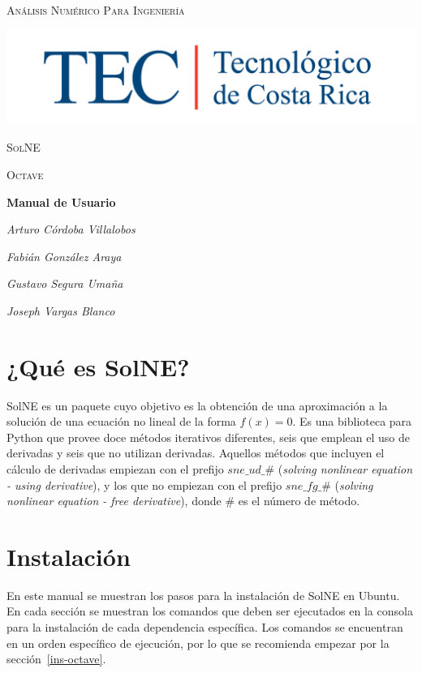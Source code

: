 \documentclass[12pt]{article}
\begin{document}
\begin{titlepage}
	\centering
	{\scshape\LARGE Análisis Numérico Para Ingeniería \par}
	\vspace{2cm}
	\includegraphics[width=16cm]{MarcaTECRGB}\par\vspace{2cm}
	{\scshape\Large SolNE\par}
	\vspace{0.5cm}
	{\scshape\LARGE Octave \par}
	\vspace{3cm}
	{\huge\bfseries Manual de Usuario\par}
	\vspace{3cm}
	{\Large\itshape Arturo Córdoba Villalobos\par}
	{\Large\itshape Fabián González Araya\par}
	{\Large\itshape Gustavo Segura Umaña\par}
	{\Large\itshape Joseph Vargas Blanco\par}

\end{titlepage}

\tableofcontents
\newpage	

\section{¿Qué es SolNE?}
SolNE es un paquete cuyo objetivo es la obtención de una aproximación a la solución de una ecuación no lineal de la forma $f(x) = 0$. Es una biblioteca para Python que provee doce métodos iterativos diferentes, seis que emplean el uso de derivadas y seis que no utilizan derivadas. Aquellos métodos que incluyen el cálculo de derivadas empiezan con el prefijo $sne\_ud\_\#$ (\textit{solving nonlinear equation - using derivative}), y los que no empiezan con el prefijo $sne\_fg\_\#$ (\textit{solving nonlinear equation - free derivative}), donde $\#$ es el número de método.

\section{Instalación}
En este  manual se muestran los pasos para la instalación de SolNE en Ubuntu. En cada sección se muestran los comandos que deben ser ejecutados en la consola para la instalación de cada dependencia específica. Los comandos se encuentran en un orden específico de ejecución, por lo que se recomienda empezar por la sección~\ref{ins-octave}.
\end{document}
